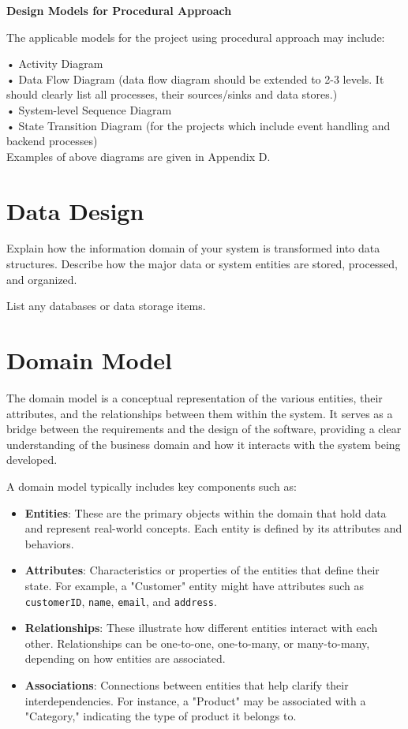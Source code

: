 \textbf{Design Models for Procedural Approach}

The applicable models for the project using procedural approach may include:

•	Activity Diagram\\
•	Data Flow Diagram (data flow diagram should be extended to 2-3 levels. It should clearly list all processes, their sources/sinks and data stores.)\\
•	System-level Sequence Diagram\\
•	State Transition Diagram (for the projects which include event handling and backend processes)\\

Examples of above diagrams are given in Appendix D.

\section{Data Design}
Explain how the information domain of your system is transformed into data structures. Describe how the major data or system entities are stored, processed, and organized. 

List any databases or data storage items.
\section{Domain Model}
The domain model is a conceptual representation of the various entities, their attributes, and the relationships between them within the system. It serves as a bridge between the requirements and the design of the software, providing a clear understanding of the business domain and how it interacts with the system being developed. 

A domain model typically includes key components such as:

\begin{itemize}
    \item \textbf{Entities}: These are the primary objects within the domain that hold data and represent real-world concepts. Each entity is defined by its attributes and behaviors.
    
    \item \textbf{Attributes}: Characteristics or properties of the entities that define their state. For example, a "Customer" entity might have attributes such as \texttt{customerID}, \texttt{name}, \texttt{email}, and \texttt{address}.
    
    \item \textbf{Relationships}: These illustrate how different entities interact with each other. Relationships can be one-to-one, one-to-many, or many-to-many, depending on how entities are associated.
    
    \item \textbf{Associations}: Connections between entities that help clarify their interdependencies. For instance, a "Product" may be associated with a "Category," indicating the type of product it belongs to.
\end{itemize}

